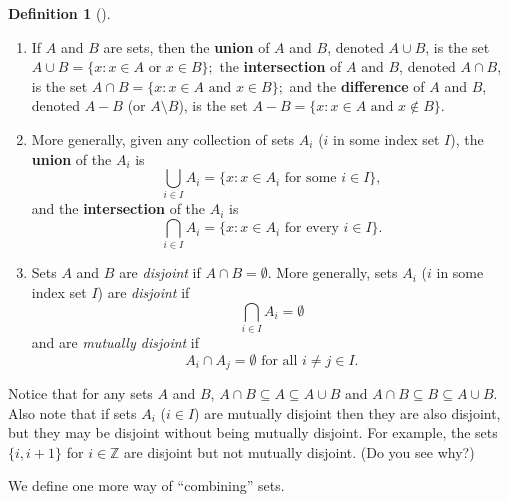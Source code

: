 \documentclass[10pt,openany,oneside]{book}
\newcommand{\terminology}[1]{\textbf{#1}}
\theoremstyle{plain}
\theoremstyle{definition}
\newtheorem{definition}[theorem]{Definition}
\theoremstyle{definition}
\theoremstyle{definition}
\theoremstyle{definition}
\numberwithin{equation}{section}
\def\Z{\mathbb{Z}}
\begin{document}
\begin{definition}[{}]\label{definition-6}
\label{notation-17}
\label{notation-18}
\label{notation-19}
\label{notation-20}
\label{notation-21}
\leavevmode%
\begin{enumerate}
\item\hypertarget{li-6}{}If \(A\) and \(B\) are sets, then the \terminology{union} of \(A\) and \(B\), denoted \(A\cup B\), is the set \(A\cup B=\{x: x\in A \text{ or }  x\in B\};\) the \terminology{intersection} of \(A\) and \(B\), denoted \(A\cap B\), is the set \(A\cap B=\{x: x\in A \text{ and }  x\in B\};\) and the \terminology{difference} of \(A\) and \(B\), denoted \(A-B\) (or \(A\setminus B\)), is the set \(A-B=\{x: x\in A \text{ and }  x\not\in B\}.\)%
\item\hypertarget{li-7}{}More generally, given any collection of sets \(A_i\) (\(i\) in some index set \(I\)), the \terminology{union} of the \(A_i\) is%
\begin{equation*}
\bigcup_{i\in I}A_i=\{x: x\in A_i \text{ for some }  i\in I\},
\end{equation*}
and the \terminology{intersection} of the \(A_i\) is%
\begin{equation*}
\bigcap_{i\in I}A_i=\{x: x\in A_i \text{ for every }  i\in I\}.
\end{equation*}
%
\item\hypertarget{li-8}{}Sets \(A\) and \(B\) are \emph{disjoint} if \(A\cap B=\emptyset\).  More generally, sets \(A_i\) (\(i\) in some index set \(I\)) are \emph{disjoint} if%
\begin{equation*}
\bigcap_{i\in I}A_i=\emptyset
\end{equation*}
and are \emph{mutually disjoint} if%
\begin{equation*}
A_i\cap A_j=\emptyset \text{ for all } i\neq j \in I.
\end{equation*}
%
\end{enumerate}
%
\end{definition}
Notice that for any sets \(A\) and \(B\), \(A\cap B \subseteq A \subseteq A\cup B\) and \(A\cap B \subseteq B \subseteq A\cup B\). Also note that if sets \(A_i\) (\(i \in I\)) are mutually disjoint then they are also disjoint, but they may be disjoint without being mutually disjoint. For example, the sets \(\{i, i+1\}\) for \(i\in \Z\) are disjoint but not mutually disjoint. (Do you see why?)%
\par
We define one more way of ``combining'' sets.%
\end{document}
